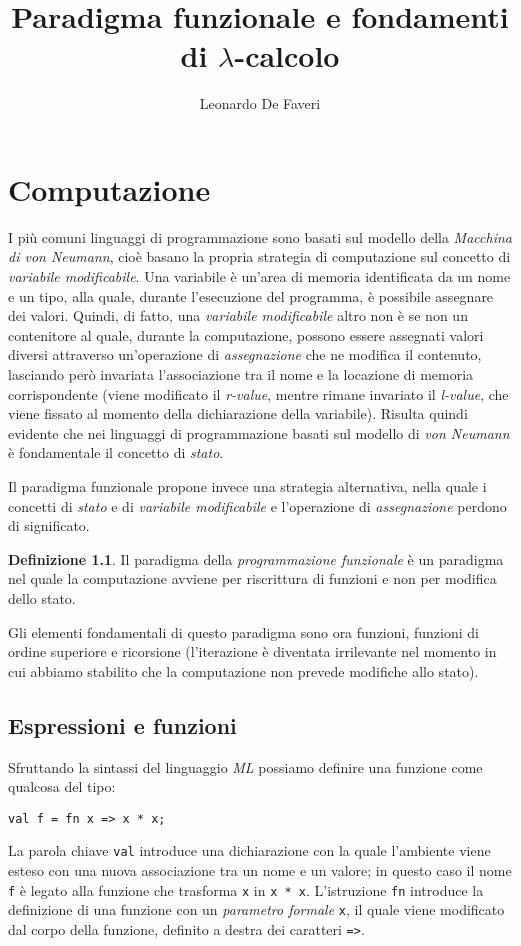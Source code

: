 \documentclass[12pt, a4paper]{report}
\title{Paradigma funzionale e fondamenti di $\lambda$-calcolo}
\author{Leonardo De Faveri}
\date{}
\theoremstyle{definition}
\newtheorem{definition}{Definizione}[section]
\newcommand{\code}[1]{\texttt{#1}}
\begin{document}
\maketitle
\tableofcontents

\chapter{Computazione}

I più comuni linguaggi di programmazione sono basati sul modello della 
\emph{Macchina di von Neumann}, cioè basano la propria strategia di computazione sul
concetto di \emph{variabile modificabile}. Una variabile è un'area di memoria
identificata da un nome e un tipo, alla quale, durante l'esecuzione del programma,
è possibile assegnare dei valori. Quindi, di fatto, una \emph{variabile modificabile}
altro non è se non un contenitore al quale, durante la computazione, possono essere
assegnati valori diversi attraverso un'operazione di \emph{assegnazione} che ne
modifica il contenuto, lasciando però invariata l'associazione tra il nome e la
locazione di memoria corrispondente (viene modificato il \emph{r-value}, mentre
rimane invariato il \emph{l-value}, che viene fissato al momento della dichiarazione
della variabile). Risulta quindi evidente che nei linguaggi di programmazione basati
sul modello di \emph{von Neumann} è fondamentale il concetto di \emph{stato}.

Il paradigma funzionale propone invece una strategia alternativa, nella quale i
concetti di \emph{stato} e di \emph{variabile modificabile} e l'operazione di
\emph{assegnazione} perdono di significato.

\begin{definition}
    Il paradigma della \emph{programmazione funzionale} è un paradigma nel quale la
    computazione avviene per riscrittura di funzioni e non per modifica dello stato.
\end{definition}

Gli elementi fondamentali di questo paradigma sono ora funzioni, funzioni di ordine
superiore e ricorsione (l'iterazione è diventata irrilevante nel momento in cui
abbiamo stabilito che la computazione non prevede modifiche allo stato).

\section{Espressioni e funzioni}
Sfruttando la sintassi del linguaggio \emph{ML} possiamo definire una funzione
come qualcosa del tipo:
\begin{lstlisting}[breaklines]
val f = fn x => x * x;
\end{lstlisting}
La parola chiave \code{val} introduce una dichiarazione con la quale l'ambiente
viene esteso con una nuova associazione tra un nome e un valore; in questo caso
il nome \code{f} è legato alla funzione che trasforma \code{x} in \code{x * x}.
L'istruzione \code{fn} introduce la definizione di una funzione con un
\emph{parametro formale} \code{x}, il quale viene modificato dal corpo della
funzione, definito a destra dei caratteri \code{=>}.
\end{document}
